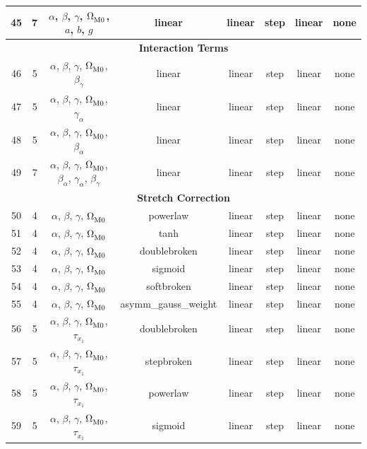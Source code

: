 \begin{longtable}{c c c c c c c c}
    45 & 7 & $\alpha$, $\beta$, $\gamma$, $\Omega_{\rm M0}^{}$, $a$, $b$, $g$ & linear & linear & step & linear & none \\
    \hline
    \multicolumn{8}{c}{\textbf{Interaction Terms}} \\
    \hline
    46 & 5 & $\alpha$, $\beta$, $\gamma$, $\Omega_{\rm M0}^{}$, $\beta_\gamma^{}$ & linear & linear & step & linear & none \\
    47 & 5 & $\alpha$, $\beta$, $\gamma$, $\Omega_{\rm M0}^{}$, $\gamma_\alpha^{}$ & linear & linear & step & linear & none \\
    48 & 5 & $\alpha$, $\beta$, $\gamma$, $\Omega_{\rm M0}^{}$, $\beta_\alpha^{}$ & linear & linear & step & linear & none \\
    49 & 7 & $\alpha$, $\beta$, $\gamma$, $\Omega_{\rm M0}^{}$, $\beta_\alpha^{}$, $\gamma_\alpha^{}$, $\beta_\gamma^{}$ & linear & linear & step & linear & none \\
    \hline
    \multicolumn{8}{c}{\textbf{Stretch Correction}} \\
    \hline
    50 & 4 & $\alpha$, $\beta$, $\gamma$, $\Omega_{\rm M0}^{}$ & powerlaw & linear & step & linear & none \\
    51 & 4 & $\alpha$, $\beta$, $\gamma$, $\Omega_{\rm M0}^{}$ & tanh & linear & step & linear & none \\
    52 & 4 & $\alpha$, $\beta$, $\gamma$, $\Omega_{\rm M0}^{}$ & doublebroken & linear & step & linear & none \\
    53 & 4 & $\alpha$, $\beta$, $\gamma$, $\Omega_{\rm M0}^{}$ & sigmoid & linear & step & linear & none \\
    54 & 4 & $\alpha$, $\beta$, $\gamma$, $\Omega_{\rm M0}^{}$ & softbroken & linear & step & linear & none \\
    55 & 4 & $\alpha$, $\beta$, $\gamma$, $\Omega_{\rm M0}^{}$ & asymm\_gauss\_weight & linear & step & linear & none \\
    56 & 5 & $\alpha$, $\beta$, $\gamma$, $\Omega_{\rm M0}^{}$, $\tau_{x_1}^{}$ & doublebroken & linear & step & linear & none \\
    57 & 5 & $\alpha$, $\beta$, $\gamma$, $\Omega_{\rm M0}^{}$, $\tau_{x_1}^{}$ & stepbroken & linear & step & linear & none \\
    58 & 5 & $\alpha$, $\beta$, $\gamma$, $\Omega_{\rm M0}^{}$, $\tau_{x_1}^{}$ & powerlaw & linear & step & linear & none \\
    59 & 5 & $\alpha$, $\beta$, $\gamma$, $\Omega_{\rm M0}^{}$, $\tau_{x_1}^{}$ & sigmoid & linear & step & linear & none \\

\end{longtable}
